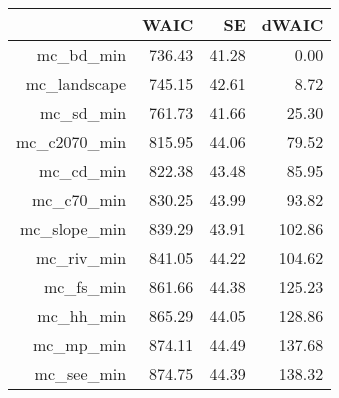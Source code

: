 \begin{table}[ht]
\centering
\begin{tabular}{rrrr}
  \hline
 & WAIC & SE & dWAIC \\ 
  \hline
mc\_bd\_min & 736.43 & 41.28 & 0.00 \\ 
  mc\_landscape & 745.15 & 42.61 & 8.72 \\ 
  mc\_sd\_min & 761.73 & 41.66 & 25.30 \\ 
  mc\_c2070\_min & 815.95 & 44.06 & 79.52 \\ 
  mc\_cd\_min & 822.38 & 43.48 & 85.95 \\ 
  mc\_c70\_min & 830.25 & 43.99 & 93.82 \\ 
  mc\_slope\_min & 839.29 & 43.91 & 102.86 \\ 
  mc\_riv\_min & 841.05 & 44.22 & 104.62 \\ 
  mc\_fs\_min & 861.66 & 44.38 & 125.23 \\ 
  mc\_hh\_min & 865.29 & 44.05 & 128.86 \\ 
  mc\_mp\_min & 874.11 & 44.49 & 137.68 \\ 
  mc\_see\_min & 874.75 & 44.39 & 138.32 \\ 
   \hline
\end{tabular}
\end{table}
